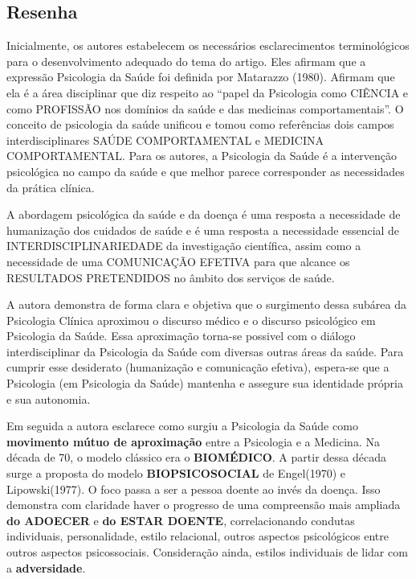 \documentclass[
]{book}
\begin{document}
\hypertarget{resenha}{%
\subsection{Resenha}\label{resenha}}

Inicialmente, os autores estabelecem os necessários esclarecimentos
terminológicos para o desenvolvimento adequado do tema do artigo. Eles
afirmam que a expressão Psicologia da Saúde foi definida por Matarazzo
(1980). Afirmam que ela é a área disciplinar que diz respeito ao ``papel
da Psicologia como CIÊNCIA e como PROFISSÃO nos domínios da saúde e das
medicinas comportamentais''. O conceito de psicologia da saúde unificou
e tomou como referências dois campos interdisciplinares SAÚDE
COMPORTAMENTAL e MEDICINA COMPORTAMENTAL. Para os autores, a Psicologia
da Saúde é a intervenção psicológica no campo da saúde e que melhor
parece corresponder as necessidades da prática clínica.

A abordagem psicológica da saúde e da doença é uma resposta a
necessidade de humanização dos cuidados de saúde e é uma resposta a
necessidade essencial de INTERDISCIPLINARIEDADE da investigação
científica, assim como a necessidade de uma COMUNICAÇÃO EFETIVA para que
alcance os RESULTADOS PRETENDIDOS no âmbito dos serviços de saúde.

A autora demonstra de forma clara e objetiva que o surgimento dessa
subárea da Psicologia Clínica aproximou o discurso médico e o discurso
psicológico em Psicologia da Saúde. Essa aproximação torna-se possivel
com o diálogo interdisciplinar da Psicologia da Saúde com diversas
outras áreas da saúde. Para cumprir esse desiderato (humanização e
comunicação efetiva), espera-se que a Psicologia (em Psicologia da
Saúde) mantenha e assegure sua identidade própria e sua autonomia.

Em seguida a autora esclarece como surgiu a Psicologia da Saúde como
\textbf{movimento mútuo de aproximação} entre a Psicologia e a Medicina.
Na década de 70, o modelo clássico era o \textbf{BIOMÉDICO}. A partir
dessa década surge a proposta do modelo \textbf{BIOPSICOSOCIAL} de
Engel(1970) e Lipowski(1977). O foco passa a ser a pessoa doente ao
invés da doença. Isso demonstra com claridade haver o progresso de uma
compreensão mais ampliada \textbf{do ADOECER} e \textbf{do ESTAR
DOENTE}, correlacionando condutas individuais, personalidade, estilo
relacional, outros aspectos psicológicos entre outros aspectos
psicossociais. Consideração ainda, estilos individuais de lidar com a
\textbf{adversidade}.
\end{document}
